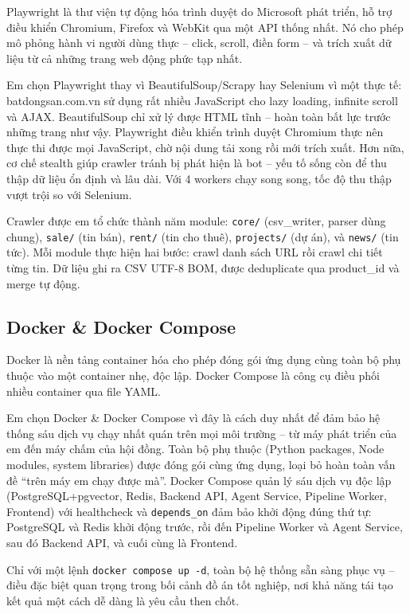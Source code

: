 Playwright là thư viện tự động hóa trình duyệt do Microsoft phát triển, hỗ trợ điều khiển Chromium, Firefox và WebKit qua một API thống nhất. Nó cho phép mô phỏng hành vi người dùng thực -- click, scroll, điền form -- và trích xuất dữ liệu từ cả những trang web động phức tạp nhất.

Em chọn Playwright thay vì BeautifulSoup/Scrapy hay Selenium vì một thực tế: batdongsan.com.vn sử dụng rất nhiều JavaScript cho lazy loading, infinite scroll và AJAX. BeautifulSoup chỉ xử lý được HTML tĩnh -- hoàn toàn bất lực trước những trang như vậy. Playwright điều khiển trình duyệt Chromium thực nên thực thi được mọi JavaScript, chờ nội dung tải xong rồi mới trích xuất. Hơn nữa, cơ chế stealth giúp crawler tránh bị phát hiện là bot -- yếu tố sống còn để thu thập dữ liệu ổn định và lâu dài. Với 4 workers chạy song song, tốc độ thu thập vượt trội so với Selenium.

Crawler được em tổ chức thành năm module: \texttt{core/} (csv\_writer, parser dùng chung), \texttt{sale/} (tin bán), \texttt{rent/} (tin cho thuê), \texttt{projects/} (dự án), và \texttt{news/} (tin tức). Mỗi module thực hiện hai bước: crawl danh sách URL rồi crawl chi tiết từng tin. Dữ liệu ghi ra CSV UTF-8 BOM, được deduplicate qua product\_id và merge tự động.

\subsection{Docker \& Docker Compose}

Docker là nền tảng container hóa cho phép đóng gói ứng dụng cùng toàn bộ phụ thuộc vào một container nhẹ, độc lập. Docker Compose là công cụ điều phối nhiều container qua file YAML.

Em chọn Docker \& Docker Compose vì đây là cách duy nhất để đảm bảo hệ thống sáu dịch vụ chạy nhất quán trên mọi môi trường -- từ máy phát triển của em đến máy chấm của hội đồng. Toàn bộ phụ thuộc (Python packages, Node modules, system libraries) được đóng gói cùng ứng dụng, loại bỏ hoàn toàn vấn đề ``trên máy em chạy được mà''. Docker Compose quản lý sáu dịch vụ độc lập (PostgreSQL+pgvector, Redis, Backend API, Agent Service, Pipeline Worker, Frontend) với healthcheck và \texttt{depends\_on} đảm bảo khởi động đúng thứ tự: PostgreSQL và Redis khởi động trước, rồi đến Pipeline Worker và Agent Service, sau đó Backend API, và cuối cùng là Frontend.

Chỉ với một lệnh \texttt{docker compose up -d}, toàn bộ hệ thống sẵn sàng phục vụ -- điều đặc biệt quan trọng trong bối cảnh đồ án tốt nghiệp, nơi khả năng tái tạo kết quả một cách dễ dàng là yêu cầu then chốt.

